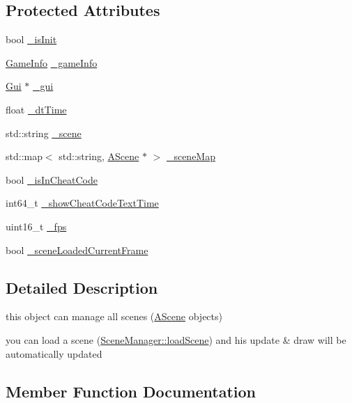 \subsection*{Protected Attributes}
\begin{DoxyCompactItemize}
\item 
bool \hyperlink{class_scene_manager_a7374e033b00588f0b365c96dede8efbc}{\+\_\+is\+Init}
\item 
\hyperlink{struct_game_info}{Game\+Info} \hyperlink{class_scene_manager_a1d39b03c8e86c12586b5a7739d6eca04}{\+\_\+game\+Info}
\item 
\hyperlink{class_gui}{Gui} $\ast$ \hyperlink{class_scene_manager_a773af17733045a87c8ffefd5d5bae5be}{\+\_\+gui}
\item 
float \hyperlink{class_scene_manager_a977ccde68ecf224d4bd5c973bc56c2d6}{\+\_\+dt\+Time}
\item 
std\+::string \hyperlink{class_scene_manager_a1a296d698bee6221417bf0837d76d8dc}{\+\_\+scene}
\item 
std\+::map$<$ std\+::string, \hyperlink{class_a_scene}{A\+Scene} $\ast$ $>$ \hyperlink{class_scene_manager_aa5ff91a38f3de01ce3fb41ac6cc62d40}{\+\_\+scene\+Map}
\item 
bool \hyperlink{class_scene_manager_a63f2feeb37fe4f7be06941dff8ef0652}{\+\_\+is\+In\+Cheat\+Code}
\item 
int64\+\_\+t \hyperlink{class_scene_manager_a27e08ee627a10d7b2e1d3ebf2ea7d2bb}{\+\_\+show\+Cheat\+Code\+Text\+Time}
\item 
uint16\+\_\+t \hyperlink{class_scene_manager_abda89dbf5fdc865be659014abfc81ea6}{\+\_\+fps}
\item 
bool \hyperlink{class_scene_manager_af1a54a7d8f6a8fb3f5e392de6d04c3bf}{\+\_\+scene\+Loaded\+Current\+Frame}
\end{DoxyCompactItemize}


\subsection{Detailed Description}
this object can manage all scenes (\hyperlink{class_a_scene}{A\+Scene} objects) 

you can load a scene (\hyperlink{class_scene_manager_ad9b4726f3b184fe06d4753513f525a44}{Scene\+Manager\+::load\+Scene}) and his update \& draw will be automatically updated 

\subsection{Member Function Documentation}
\mbox{\label{class_scene_manager_adc10bb1fde4ed648080de309e69331c9}} 
